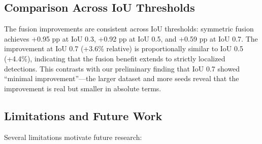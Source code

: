 \documentclass[sustainability,article,submit,moreauthors,pdftex]{Definitions/mdpi}
\begin{document}
\subsection{Comparison Across IoU Thresholds}

The fusion improvements are consistent across IoU thresholds: symmetric fusion achieves +0.95 pp at IoU 0.3, +0.92 pp at IoU 0.5, and +0.59 pp at IoU 0.7. The improvement at IoU 0.7 (+3.6\% relative) is proportionally similar to IoU 0.5 (+4.4\%), indicating that the fusion benefit extends to strictly localized detections. This contrasts with our preliminary finding that IoU 0.7 showed ``minimal improvement''---the larger dataset and more seeds reveal that the improvement is real but smaller in absolute terms.

\subsection{Limitations and Future Work}

Several limitations motivate future research:
\end{document}
